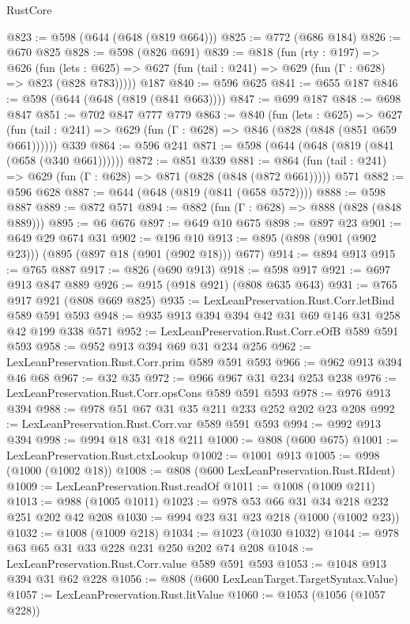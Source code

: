 \begin{lexlean}{RustCore}
\begin{coremodule}
@823 := @598 (@644 (@648 (@819 @664)))
@825 := @772 (@686 @184)
@826 := @670 @825
@828 := @598 (@826 @691)
@839 := @818
    (fun (rty : @197) =>
    @626
      (fun (lets : @625) => @627 (fun (tail : @241) => @629 (fun (Γ : @628) => @823 (@828 @783)))))
    @187
@840 := @596 @625
@841 := @655 @187
@846 := @598 (@644 (@648 (@819 (@841 @663))))
@847 := @699 @187
@848 := @698 @847
@851 := @702 @847 @777 @779
@863 := @840
    (fun (lets : @625) =>
    @627 (fun (tail : @241) => @629 (fun (Γ : @628) => @846 (@828 (@848 (@851 @659 @661))))))
    @339
@864 := @596 @241
@871 := @598 (@644 (@648 (@819 (@841 (@658 (@340 @661))))))
@872 := @851 @339
@881 := @864 (fun (tail : @241) => @629 (fun (Γ : @628) => @871 (@828 (@848 (@872 @661))))) @571
@882 := @596 @628
@887 := @644 (@648 (@819 (@841 (@658 @572))))
@888 := @598 @887
@889 := @872 @571
@894 := @882 (fun (Γ : @628) => @888 (@828 (@848 @889)))
@895 := @6 @676
@897 := @649 @10 @675
@898 := @897 @23
@901 := @649 @29 @674 @31
@902 := @196 @10
@913 := @895 (@898 (@901 (@902 @23))) (@895 (@897 @18 (@901 (@902 @18))) @677)
@914 := @894 @913
@915 := @765 @887
@917 := @826 (@690 @913)
@918 := @598 @917
@921 := @697 @913 @847 @889
@926 := @915 (@918 @921) (@808 @635 @643)
@931 := @765 @917 @921 (@808 @669 @825)
@935 := LexLeanPreservation.Rust.Corr.letBind @589 @591 @593
@948 := @935 @913 @394 @394 @42 @31 @69 @146 @31 @258 @42 @199 @338 @571
@952 := LexLeanPreservation.Rust.Corr.eOfB @589 @591 @593
@958 := @952 @913 @394 @69 @31 @234 @256
@962 := LexLeanPreservation.Rust.Corr.prim @589 @591 @593
@966 := @962 @913 @394 @46 @68
@967 := @32 @35
@972 := @966 @967 @31 @234 @253 @238
@976 := LexLeanPreservation.Rust.Corr.opsCons @589 @591 @593
@978 := @976 @913 @394
@988 := @978 @51 @67 @31 @35 @211 @233 @252 @202 @23 @208
@992 := LexLeanPreservation.Rust.Corr.var @589 @591 @593
@994 := @992 @913 @394
@998 := @994 @18 @31 @18 @211
@1000 := @808 (@600 @675)
@1001 := LexLeanPreservation.Rust.ctxLookup
@1002 := @1001 @913
@1005 := @998 (@1000 (@1002 @18))
@1008 := @808 (@600 LexLeanPreservation.Rust.RIdent)
@1009 := LexLeanPreservation.Rust.readOf
@1011 := @1008 (@1009 @211)
@1013 := @988 (@1005 @1011)
@1023 := @978 @53 @66 @31 @34 @218 @232 @251 @202 @42 @208
@1030 := @994 @23 @31 @23 @218 (@1000 (@1002 @23))
@1032 := @1008 (@1009 @218)
@1034 := @1023 (@1030 @1032)
@1044 := @978 @63 @65 @31 @33 @228 @231 @250 @202 @74 @208
@1048 := LexLeanPreservation.Rust.Corr.value @589 @591 @593
@1053 := @1048 @913 @394 @31 @62 @228
@1056 := @808 (@600 LexLeanTarget.TargetSyntax.Value)
@1057 := LexLeanPreservation.Rust.litValue
@1060 := @1053 (@1056 (@1057 @228))

\end{coremodule}
\end{lexlean}
